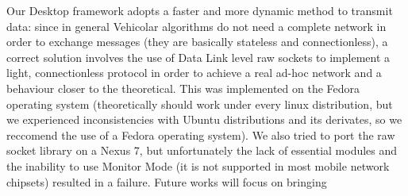 	Our Desktop framework adopts a faster and more dynamic method to transmit data: since in general Vehicolar algorithms do not need a complete network in order to exchange messages (they are basically stateless and connectionless), a correct solution involves the use of Data Link level raw sockets to implement a light, connectionless protocol in order to achieve a real ad-hoc network and a behaviour closer to the theoretical. This was implemented on the Fedora operating system (theoretically should work under every linux distribution, but we experienced inconsistencies with Ubuntu distributions and its derivates, so we reccomend the use of a Fedora operating system). We also tried to port the raw socket library on a Nexus 7, but unfortunately the lack of essential modules and the inability to use Monitor Mode (it is not supported in most mobile network chipsets) resulted in a failure. Future works will focus on bringing  

